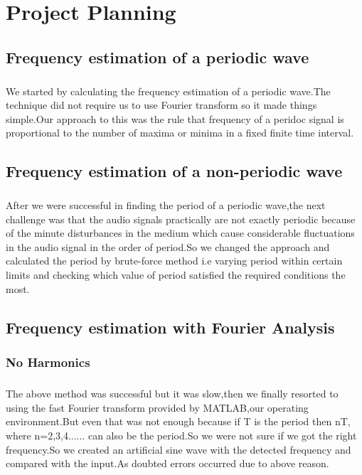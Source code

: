 \chapter{Project Planning}
\section{Frequency estimation of a periodic wave}
\paragraph{}
We started by calculating the frequency estimation of a periodic wave.The technique did not require us to use Fourier transform so it made things simple.Our approach to this was the rule that frequency of a peridoc signal is proportional to the number of maxima or minima in a fixed finite time interval.
\section{Frequency estimation of a non-periodic wave}
\paragraph{}
After we were successful in finding the period of a periodic wave,the next challenge was that the audio signals practically are not exactly periodic because of the minute disturbances in the medium which cause considerable fluctuations in the audio signal in the order of period.So we changed the approach and calculated the period by brute-force method i.e varying period within certain limits and checking which value of period satisfied the required conditions the most.
\section{Frequency estimation with Fourier Analysis}
\subsection{No Harmonics}
\paragraph{}
The above method was successful but it was slow,then we finally resorted to using the fast Fourier transform provided by MATLAB,our operating environment.But even that was not enough because if T is the period then nT, where n=2,3,4...... can also be the period.So we were not sure if we got the right frequency.So we created an artificial sine wave with the detected frequency and compared with the input.As doubted errors occurred due to above reason.
